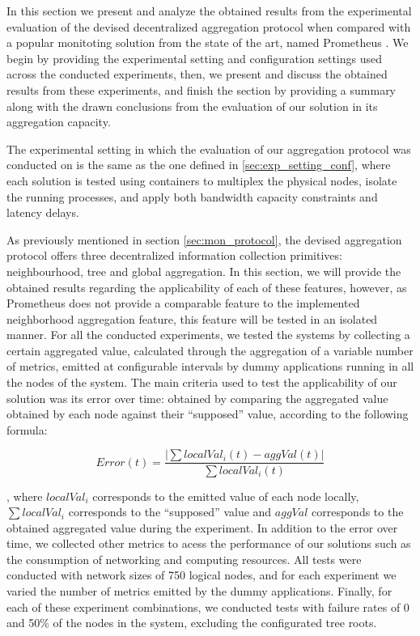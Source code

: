 

In this section we present and analyze the obtained results from the experimental evaluation of the devised decentralized aggregation protocol when compared with a popular monitoting solution from the state of the art, named Prometheus . We begin by providing the experimental setting and configuration settings used across the conducted experiments, then, we present and discuss the obtained results from these experiments, and finish the section by providing a summary along with the drawn conclusions from the evaluation of our solution in its aggregation capacity.

The experimental setting in which the evaluation of our aggregation protocol was conducted on is the same as the one defined in \ref{sec:exp_setting_conf}, where each solution is tested using containers to multiplex the physical nodes, isolate the running processes, and apply both bandwidth capacity constraints and latency delays.

As previously mentioned in section \ref{sec:mon_protocol}, the devised aggregation protocol offers three decentralized information collection primitives: neighbourhood, tree and global aggregation. In this section, we will provide the obtained results regarding the applicability of each of these features, however, as Prometheus does not provide a comparable feature to the implemented neighborhood aggregation feature, this feature will be tested in an isolated manner. For all the conducted experiments, we tested the systems by collecting a certain aggregated value, calculated through the aggregation of a variable number of metrics, emitted at configurable intervals by dummy applications running in all the nodes of the system. The main criteria used to test the applicability of our solution was its error over time: obtained by comparing the aggregated value obtained by each node against their ``supposed'' value, according to the following formula: 

\[ Error(t) =  \frac{|\sum localVal_i(t) - aggVal(t)|}{\sum localVal_i(t)}\]

, where $localVal_i$ corresponds to the emitted value of each node locally, $\sum localVal_i$ corresponds to the ``supposed'' value and $aggVal$ corresponds to the obtained aggregated value during the experiment. In addition to the error over time, we collected other metrics to acess the performance of our solutions such as the consumption of networking and computing resources. All tests were conducted with network sizes of 750 logical nodes, and for each experiment we varied the number of metrics emitted by the dummy applications. Finally, for each of these experiment combinations, we conducted tests with failure rates of 0 and 50\% of the nodes in the system, excluding the configurated tree roots.

